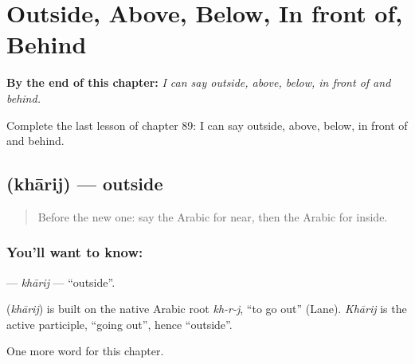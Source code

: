 
\chapter{Outside, Above, Below, In front of, Behind}
\label{ch:ar-outside-above-below-in-front-of-behind}

\begin{chapteropening}
\textbf{By the end of this chapter:} \emph{I can say outside, above, below, in front of and behind.}

Complete the last lesson of chapter 89: I can say outside, above, below, in front of and behind.
\end{chapteropening}

\section[\texorpdfstring{\ar{خارج} (khārij)}{خارج (khārij)}]{ (khārij) — outside}

\label{lesson:AR-C89-kharij}



\begin{quote}
Before the new one: say the Arabic for near, then the Arabic for inside.
\end{quote}

\subsection*{You'll want to know: }
\textbf{} — \emph{khārij} — \textquotedblleft{}outside\textquotedblright{}.

\begin{cousinweb}
\textbf{} (\emph{khārij}) is built on the native Arabic root \emph{kh-r-j}, \textquotedblleft{}to go out\textquotedblright{} (Lane). \emph{Khārij} is the active participle, \textquotedblleft{}going out\textquotedblright{}, hence \textquotedblleft{}outside\textquotedblright{}.
\end{cousinweb}

\begin{grammarlens}[title={What you've built}]
One more word for this chapter.
\end{grammarlens}

